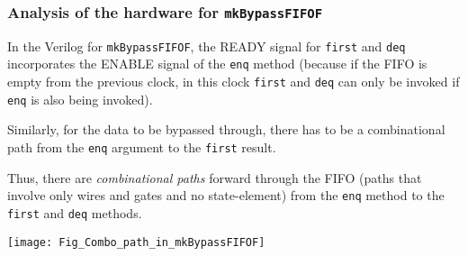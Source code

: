 \begin{frame}[fragile]
\frametitle{Analysis of the hardware for {\tt mkBypassFIFOF}}

\footnotesize

In the Verilog for \verb|mkBypassFIFOF|, the READY signal
for \verb|first| and \verb|deq| incorporates the ENABLE signal of
the \verb|enq| method (because if the FIFO is empty from the previous
clock, in this clock \verb|first| and \verb|deq| can only be invoked
if \verb|enq| is also being invoked).

\vspace{2ex}

Similarly, for the data to be bypassed through, there has to be a
combinational path from the \verb|enq| argument to the \verb|first|
result.

\vspace{2ex}

Thus, there are \emph{combinational paths} forward through the FIFO
(paths that involve only wires and gates and no state-element) from
the \verb|enq| method to the \verb|first| and \verb|deq| methods.

\vspace{2ex}

\begin{center}
  \texttt{[image: Fig\_Combo\_path\_in\_mkBypassFIFOF]}
\end{center}

\end{frame}


